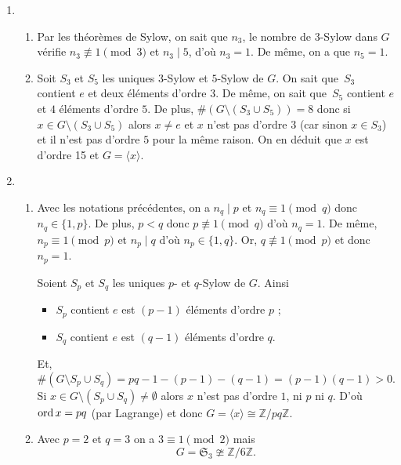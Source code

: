 \documentclass[./main]{subfiles}
\begin{document}
  \begin{enumerate}
    \item 
      \begin{enumerate}
        \item Par les théorèmes de Sylow, on sait que $n_3$, le nombre de $3$-Sylow dans $G$ vérifie $n_3 \not\equiv 1 \pmod 3$ et $n_3  \mid 5$, d'où $n_3 = 1$.
          De même, on a que $n_5 = 1$.
        \item Soit $S_3$ et $S_5$ les uniques $3$-Sylow et $5$-Sylow de $G$.
          On sait que~$S_3$ contient $e$ et deux éléments d'ordre $3$.
          De même, on sait que~$S_5$ contient $e$ et $4$ éléments d'ordre $5$.
          De plus, $\#(G \setminus (S_3 \cup S_5)) = 8$ donc si $x \in G \setminus(S_3 \cup S_5)$ alors $x \neq e$ et $x$ n'est pas d'ordre $3$ (car sinon $x \in S_3$) et il n'est pas d'ordre $5$ pour la même raison.
          On en déduit que $x$ est d'ordre 15 et $G = \langle x \rangle$.
      \end{enumerate}
    \item 
      \begin{enumerate}
        \item Avec les notations précédentes, on a $n_q  \mid p$ et $n_q \equiv 1 \pmod q$ donc $n_q \in \{1, p\}$.
          De plus, $p < q$ donc $p \not\equiv 1 \pmod q$ d'où $n_q = 1$.
          De même, $n_p \equiv 1 \pmod p$ et $n_p  \mid q$ d'où $n_p \in \{1,q\}$.
          Or, $q \not\equiv 1 \pmod p$  et donc $n_p = 1$.

          Soient $S_p$ et $S_q$ les uniques $p$- et $q$-Sylow de $G$.
          Ainsi 
          \begin{itemize}
            \item $S_p$ contient $e$ est $(p-1)$ éléments d'ordre $p$ ;
            \item $S_q$ contient $e$ est $(q-1)$ éléments d'ordre $q$.
          \end{itemize}
          Et, 
          \[
          \#(G \setminus S_p \cup S_q) = pq - 1 - (p-1) - (q-1) = (p-1)(q-1) > 0
          .\]
          Si $x \in G \setminus (S_p \cup S_q) \neq \emptyset$ alors $x$ n'est pas d'ordre $1$, ni $p$ ni $q$.
          D'où $\operatorname{ord} x = pq$ (par Lagrange) et donc $G = \langle x \rangle \cong \mathds{Z} / pq \mathds{Z}$.
        \item Avec $p = 2$ et $q = 3$ on a $3 \equiv 1 \pmod 2$ mais \[
            G = \mathfrak{S}_3 \ncong \mathds{Z}/6\mathds{Z}
        .\] 
      \end{enumerate}
  \end{enumerate}
\end{document}
